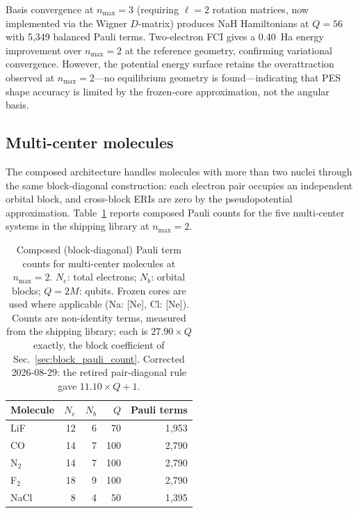\documentclass[aps,pra,twocolumn,superscriptaddress,longbibliography]{revtex4-2}
\newcommand{\gvq}[2]{#2}
\begin{document}
Basis convergence at $n_{\max} = 3$ (requiring $\ell = 2$ rotation
matrices, now implemented via the Wigner $D$-matrix) produces NaH
Hamiltonians at $Q = 56$ with 5{,}349 balanced Pauli terms.
Two-electron FCI gives a 0.40~Ha energy improvement over $n_{\max} = 2$
at the reference geometry, confirming variational convergence.
However, the potential energy surface retains the overattraction
observed at $n_{\max} = 2$---no equilibrium geometry is found---indicating
that PES shape accuracy is limited by the frozen-core
approximation, not the angular basis.


\subsection{Multi-center molecules}
\label{sec:multi_center}

The composed architecture handles molecules with more than two nuclei
through the same block-diagonal construction: each electron pair
occupies an independent orbital block, and cross-block ERIs are zero
by the pseudopotential approximation.  Table~\ref{tab:multi_center}
reports composed Pauli counts for the five multi-center systems
in the shipping library at $n_{\max} = 2$.

\begin{table}[t]
\caption{Composed (block-diagonal) Pauli term counts for multi-center
  molecules at $n_{\max} = 2$.  $N_e$: total electrons;
  $N_b$: orbital blocks; $Q = 2M$: qubits.  Frozen cores are used
  where applicable (Na: [Ne], Cl: [Ne]).  Counts are non-identity terms,
  measured from the shipping library; each is $\gvq{composed_coeff}{27.90} \times Q$ exactly,
  the block coefficient of Sec.~\ref{sec:block_pauli_count}.  Corrected
  2026-08-29: the retired pair-diagonal rule gave $11.10 \times Q + 1$.}
\label{tab:multi_center}
\begin{ruledtabular}
\begin{tabular}{lrrrr}
Molecule & $N_e$ & $N_b$ & $Q$ & Pauli terms \\
\hline
LiF      & 12 & 6 &  70 &   1{,}953 \\
CO       & 14 & 7 & 100 &   2{,}790 \\
N$_2$    & 14 & 7 & 100 &   2{,}790 \\
F$_2$    & 18 & 9 & 100 &   2{,}790 \\
NaCl     &  8 & 4 &  50 &   1{,}395 \\
\end{tabular}
\end{ruledtabular}
\end{table}
\end{document}
